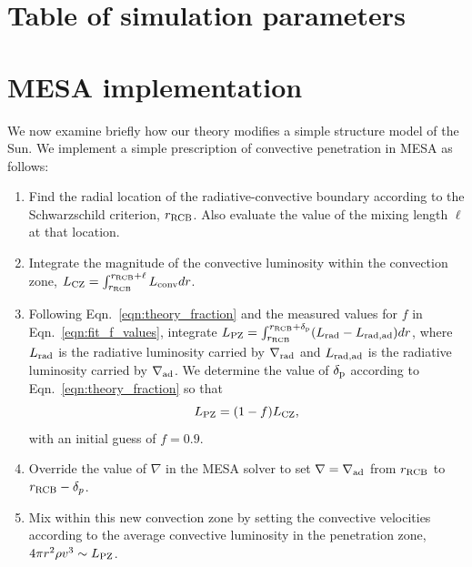 \documentclass{aastex631}
\newcommand{\gradrad}{\ensuremath{\nabla_{\rm{rad}}}}
\newcommand{\gradad}{\ensuremath{\nabla_{\rm{ad}}}}
\newcommand{\justgrad}{\ensuremath{\nabla}}
\newcommand{\delp}{\ensuremath{\delta_{\rm{p}}}}
\begin{document}
\section{Table of simulation parameters}
\label{app:simulation_table}


\section{MESA implementation}
\label{app:mesa}
We now examine briefly how our theory modifies a simple structure model of the Sun.
We implement a simple prescription of convective penetration in MESA \citep{paxton_etal_2013} as follows:
\begin{enumerate}
\item Find the radial location of the radiative-convective boundary according to the Schwarzschild criterion, $r_{\rm{RCB}}$.
Also evaluate the value of the mixing length $\ell$ at that location.
\item Integrate the magnitude of the convective luminosity within the convection zone, $L_{\rm{CZ}} = \int_{r_{\rm{RCB}}}^{r_{\rm{RCB}} + \ell} L_{\rm{conv}} dr$.
\item Following Eqn.~\ref{eqn:theory_fraction} and the measured values for $f$ in Eqn.~\ref{eqn:fit_f_values}, integrate $L_{\rm{PZ}} = \int_{r_{\rm{RCB}}}^{r_{\rm{RCB}} + \delp} (L_{\rm{rad}} - L_{\rm{rad,ad}}) dr$, where $L_{\rm{rad}}$ is the radiative luminosity carried by $\gradrad$ and $L_{\rm{rad,ad}}$ is the radiative luminosity carried by $\gradad$.
We determine the value of $\delp$ according to Eqn.~\ref{eqn:theory_fraction} so that
\begin{equation}
L_{\rm{PZ}} = (1 - f)L_{\rm{CZ}},
\label{eqn:mesa_equation}
\end{equation}
with an initial guess of $f = 0.9$.
\item Override the value of $\justgrad$ in the MESA solver to set $\justgrad = \gradad$ from $r_{\rm{RCB}}$ to $r_{\rm{RCB}} - \delta_p$.
\item Mix within this new convection zone by setting the convective velocities according to the average convective luminosity in the penetration zone, $4\pi r^2 \rho v^3 \sim L_{\rm{PZ}}$.
\end{enumerate}







\end{document}
